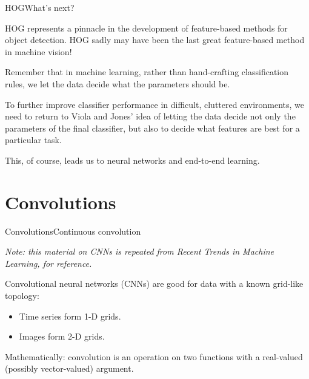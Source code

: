 \documentclass[aspectratio=169]{beamer}
\begin{document}
\begin{frame}{HOG}{What's next?}

  HOG represents a pinnacle in the development of
  feature-based methods for object detection. HOG sadly
  may have been \alert{the last great feature-based method} in machine
  vision!

  \medskip

  Remember that in machine learning, rather than hand-crafting
  classification rules, we \alert{let the data decide} what the
  parameters should be.

  \medskip
  
  To further improve classifier performance in difficult, cluttered
  environments, we need to return to Viola and Jones' idea of letting
  the data decide not only the parameters of the final classifier, but
  also to decide \alert{what features are best for a particular task}.

  \medskip

  This, of course, leads us to neural networks and \alert{end-to-end}
  learning.

\end{frame}


\section{Convolutions}

\begin{frame}{Convolutions}{Continuous convolution}

  \textit{Note: this material on CNNs is repeated from Recent
	Trends in Machine Learning, for reference.}

  \medskip

  \alert{Convolutional neural networks} (CNNs) are good for data with
  a known grid-like topology:
\begin{itemize}
\item Time series form 1-D grids.
\item Images form 2-D grids.
\end{itemize}

Mathematically: convolution is an operation on \alert{two functions}
with a \alert{real-valued} (possibly vector-valued) argument.

\end{frame}
\end{document}
